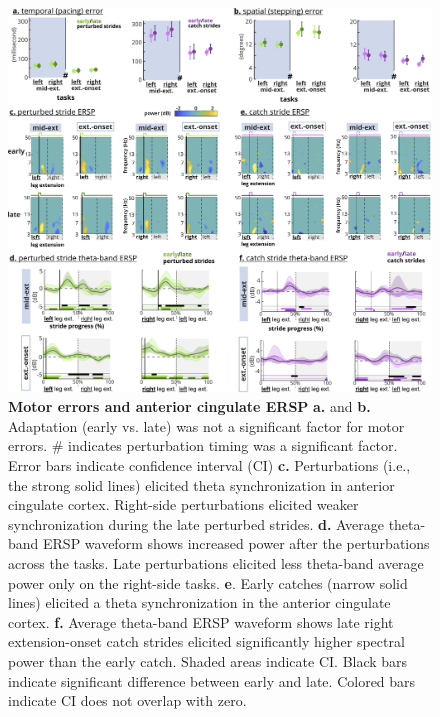 \documentclass[shortpaper,twoside,web]{ieeecolor}
\begin{document}
\begin{figure}[!t]
\centerline{\includegraphics{figures/hyp1and2.jpg}}
\caption{\textbf{Motor errors and anterior cingulate ERSP} \textbf{a.} and \textbf{b.} Adaptation (early vs. late) was not a significant factor for motor errors. \# indicates perturbation timing was a significant factor. Error bars indicate confidence interval (CI) \textbf{c.} Perturbations (i.e., the strong solid lines) elicited theta synchronization in anterior cingulate cortex. Right-side perturbations elicited weaker synchronization during the late perturbed strides. \textbf{d.} Average theta-band ERSP waveform shows increased power after the perturbations across the tasks. Late perturbations elicited less theta-band average power only on the right-side tasks. \textbf{e}. Early catches (narrow solid lines) elicited a theta synchronization in the anterior cingulate cortex. \textbf{f.} Average theta-band ERSP waveform shows late right extension-onset catch strides elicited significantly higher spectral power than the early catch. Shaded areas indicate CI. Black bars indicate significant difference between early and late. Colored bars indicate CI does not overlap with zero.}
\label{fig6}
\end{figure}
\end{document}
